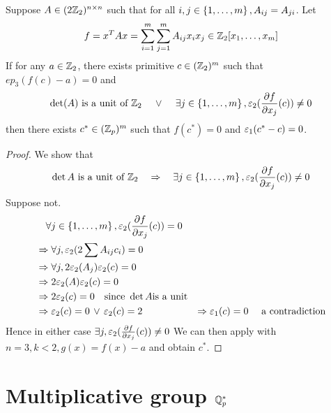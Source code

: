 \begin{cor}
    Suppose $A \in (2 \mathbb{Z}_2)^{n \times n}$
    such that for all 
    $i,j \in \left\{1,\dots,m\right\}, A_{ij} = A_{ji}$. 
    Let
    \[
        f = x^T A x = 
        \sum_{i = 1}^m \sum_{j = 1}^m A_{ij} x_i x_j
        \in \mathbb{Z}_2[x_1,\dots,x_m]
    \]
    If for any $a \in \mathbb{Z}_2$,
    there exists primitive $c \in (\mathbb{Z}_2)^m$
    such that $ep_3(f(c) - a) = 0$ and
    \[\det(A) \text{ is a unit of } \mathbb{Z}_2 \quad \, \lor \, \quad 
    \exists j \in \left\{1,\dots,m\right\}, \varepsilon_2(\frac{\partial f}{\partial x_j}(c)) \ne 0\]
    then there exists $c^* \in (\mathbb{Z}_p)^m$
    such that $f(c^*) = 0$ and $\varepsilon_1(c^* - c) = 0$.   
\end{cor}
\begin{proof}
    We show that 
    \[\det A \text{ is a unit of } \mathbb{Z}_2 \quad \Rightarrow \quad 
    \exists j \in \left\{1,\dots,m\right\}, \varepsilon_2(\frac{\partial f}{\partial x_j}(c)) \ne 0\]
    Suppose not.
    \begin{align*}
        &\quad \forall j \in \left\{1,\dots,m\right\}, \varepsilon_2(\frac{\partial f}{\partial x_j}(c)) = 0\\
        &\Rightarrow \forall j, \varepsilon_2(2 \sum A_{ij} c_i) = 0\\
        &\Rightarrow \forall j, 2 \varepsilon_2(A_j)\varepsilon_2(c) = 0\\
        &\Rightarrow 2 \varepsilon_2(A)\varepsilon_2(c) = 0\\
        &\Rightarrow 2 \varepsilon_2(c) = 0 \quad \text{since } 
        \det A \text{is a unit}\\
        &\Rightarrow \varepsilon_2(c) = 0 \, \lor \, \varepsilon_2(c) = 2
        &\Rightarrow \varepsilon_1(c) = 0 \quad \text{ a contradiction}
    \end{align*}
    Hence in either case $\exists j, \varepsilon_2(\frac{\partial f}{\partial x_j}(c)) \ne 0$
    We can then apply  
    with $n = 3, k < 2, g(x) = f(x) - a$ and obtain $c^*$.
\end{proof}

\section{Multiplicative group $\mathbb{Q}_p^*$}

